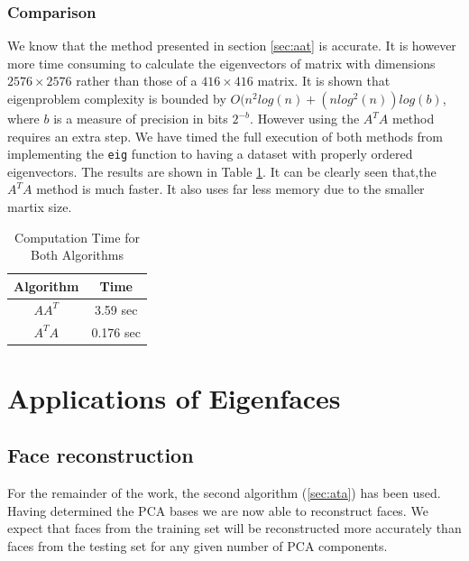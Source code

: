 \documentclass[10pt,twocolumn,letterpaper]{article}
\begin{document}
\subsubsection{Comparison}

We know that the method presented in section \ref{sec:aat} is accurate. It is however more time consuming to calculate the eigenvectors of matrix with dimensions $2576 \times 2576$ rather than those of a $416 \times 416$ matrix. It is shown \cite{Complex} that eigenproblem complexity is bounded by $O(n^2log(n)+(nlog^2(n))log(b)$, where $b$ is a measure of precision in bits $2^{-b}$. However using the  $A^TA$  method requires an extra step. We have timed the full execution of both methods from implementing the {\tt\small eig} function to having a dataset with properly ordered eigenvectors. The results are shown in Table \ref{tab:times1}. It can be clearly seen that,the $A^TA$ method is much faster. It also uses far less memory due to the smaller martix size.

\begin{table}[H]
\begin{center}
\begin{tabular}{||c c||}
\hline
\bf Algorithm & \bf Time\\ [0.5ex]
\hline
 $AA^T$ & 3.59 sec\\ [0.5ex]
\hline
 $A^TA$ & 0.176 sec \\ [0.5ex]
\hline
\end{tabular}
\end{center}
\caption{Computation Time for Both Algorithms} \label{tab:times1}
\end{table}

\section{Applications of Eigenfaces}
\subsection{Face reconstruction}

For the remainder of the work, the second algorithm (\ref{sec:ata}) has been used. Having determined the PCA bases we are now able to reconstruct faces. We expect that faces from the training set will be reconstructed more accurately than faces from the testing set for any given number of PCA components.
\end{document}
